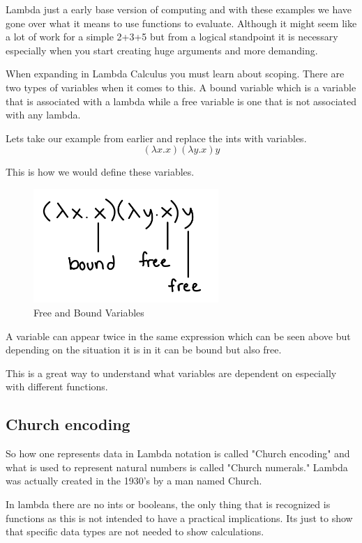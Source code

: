 \documentclass{article}
\begin{document}
\medskip\noindent
Lambda just a early base version of computing and with these examples we have gone over what it means to use functions to evaluate. Although it might seem like a lot of work for a simple 2+3+5 but from a logical standpoint it is necessary especially when you start creating huge arguments and more demanding. 

\medskip\noindent
When expanding in Lambda Calculus you must learn about scoping. There are two types of variables when it comes to this. A bound variable which is a variable that is associated with a lambda while a free variable is one that is not associated with any lambda.

\medskip\noindent
Lets take our example from earlier and replace the ints with variables. 
$$ (\lambda x.x)(\lambda y.x)y$$

\medskip\noindent
This is how we would define these variables.

\medskip\noindent 
\begin{figure}[htp]
    \centering
    \includegraphics[width=7cm]{IMG_0680.jpg}
    \caption{Free and Bound Variables}
    \label{fig:Free and Bound}
\end{figure}

\medskip\noindent
A variable can appear twice in the same expression which can be seen above but depending on the situation it is in it can be bound but also free.

\medskip\noindent
This is a great way to understand what variables are dependent on especially with different functions. 

\subsection{Church encoding}

\medskip\noindent
So how one represents data in Lambda notation is called "Church encoding" and what is used to represent natural numbers is called "Church numerals." Lambda was actually created in the 1930's by a man named Church. 

\medskip\noindent
In lambda there are no ints or booleans, the only thing that is recognized is functions as this is not intended to have a practical implications. Its just to show that specific data types are not needed to show calculations. \cite{CEN}
\end{document}
